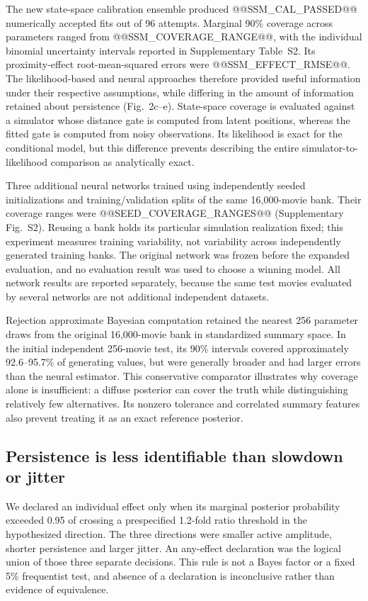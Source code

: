 \documentclass[12pt]{article}
\begin{document}
The new state-space calibration ensemble produced @@SSM_CAL_PASSED@@ numerically accepted fits out of 96 attempts. Marginal 90\% coverage across parameters ranged from @@SSM_COVERAGE_RANGE@@, with the individual binomial uncertainty intervals reported in Supplementary Table~S2. Its proximity-effect root-mean-squared errors were @@SSM_EFFECT_RMSE@@. The likelihood-based and neural approaches therefore provided useful information under their respective assumptions, while differing in the amount of information retained about persistence (Fig.~2c--e). State-space coverage is evaluated against a simulator whose distance gate is computed from latent positions, whereas the fitted gate is computed from noisy observations. Its likelihood is exact for the conditional model, but this difference prevents describing the entire simulator-to-likelihood comparison as analytically exact.

Three additional neural networks trained using independently seeded initializations and training/validation splits of the same 16,000-movie bank. Their coverage ranges were @@SEED_COVERAGE_RANGES@@ (Supplementary Fig.~S2). Reusing a bank holds its particular simulation realization fixed; this experiment measures training variability, not variability across independently generated training banks. The original network was frozen before the expanded evaluation, and no evaluation result was used to choose a winning model. All network results are reported separately, because the same test movies evaluated by several networks are not additional independent datasets.

Rejection approximate Bayesian computation retained the nearest 256 parameter draws from the original 16,000-movie bank in standardized summary space. In the initial independent 256-movie test, its 90\% intervals covered approximately 92.6--95.7\% of generating values, but were generally broader and had larger errors than the neural estimator. This conservative comparator illustrates why coverage alone is insufficient: a diffuse posterior can cover the truth while distinguishing relatively few alternatives. Its nonzero tolerance and correlated summary features also prevent treating it as an exact reference posterior.

\subsection*{Persistence is less identifiable than slowdown or jitter}
We declared an individual effect only when its marginal posterior probability exceeded 0.95 of crossing a prespecified 1.2-fold ratio threshold in the hypothesized direction. The three directions were smaller active amplitude, shorter persistence and larger jitter. An any-effect declaration was the logical union of those three separate decisions. This rule is not a Bayes factor or a fixed 5\% frequentist test, and absence of a declaration is inconclusive rather than evidence of equivalence.
\end{document}
